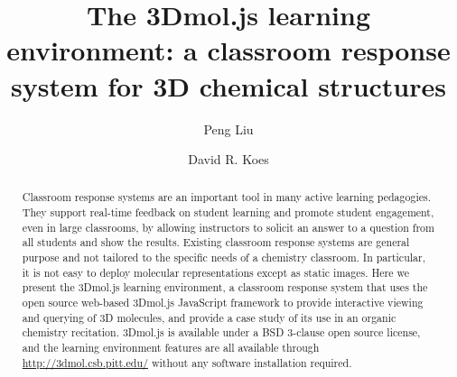 \documentclass[journal=jceda8,manuscript=article]{achemso}
\author{Peng Liu}
\affiliation[Pitt]{Department of Chemistry, University of Pittsburgh}
\author{David R. Koes}
\affiliation[Pitt]{Department of Computational and Systems Biology, University of Pittsburgh}
\title[3Dmol.js]
  {The 3Dmol.js learning environment: a classroom response system for 3D chemical structures}
\begin{document}
\begin{tocentry}
\end{tocentry}

\begin{abstract}
Classroom response systems are an important tool in many active learning pedagogies.  They support real-time feedback on student learning and promote student engagement, even in large classrooms, by allowing instructors to solicit an answer to a question from all students and show the results. Existing classroom response systems are general purpose and not tailored to the specific needs of a chemistry classroom.  In particular, it is not easy to deploy molecular representations except as static images. Here we present the 3Dmol.js learning environment, a classroom response system that uses the open source web-based 3Dmol.js JavaScript framework to provide interactive viewing and querying of 3D molecules, and provide a case study of its use in an organic chemistry recitation.  3Dmol.js is available under a BSD 3-clause open source license, and the learning environment features are all available through \url{http://3dmol.csb.pitt.edu/} without any software installation required.
\end{abstract}

\end{document}
